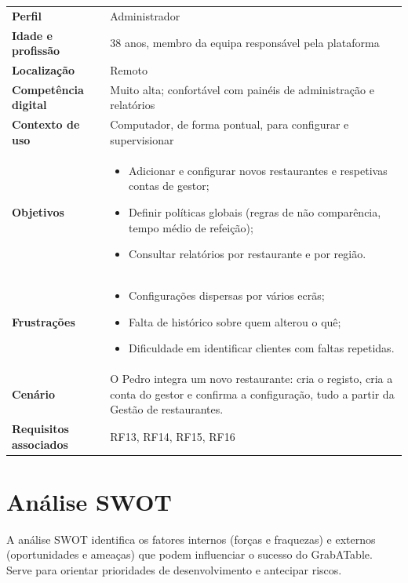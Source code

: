 \begin{tabularx}{\textwidth}{@{}>{\bfseries}p{3.4cm}X@{}}
\toprule
Perfil & Administrador \\
Idade e profissão & 38 anos, membro da equipa responsável pela plataforma \\
Localização & Remoto \\
Competência digital & Muito alta; confortável com painéis de administração e relatórios \\
Contexto de uso & Computador, de forma pontual, para configurar e supervisionar \\
\midrule
Objetivos &
\begin{itemize}[nosep,leftmargin=*]
  \item Adicionar e configurar novos restaurantes e respetivas contas de gestor;
  \item Definir políticas globais (regras de não comparência, tempo médio de refeição);
  \item Consultar relatórios por restaurante e por região.
\end{itemize} \\
Frustrações &
\begin{itemize}[nosep,leftmargin=*]
  \item Configurações dispersas por vários ecrãs;
  \item Falta de histórico sobre quem alterou o quê;
  \item Dificuldade em identificar clientes com faltas repetidas.
\end{itemize} \\
Cenário &
O Pedro integra um novo restaurante: cria o registo, cria a conta do gestor e confirma a configuração, tudo a partir da Gestão de restaurantes. \\
Requisitos associados & RF13, RF14, RF15, RF16 \\
\bottomrule
\end{tabularx}
 
 
 
\section{Análise SWOT}
 
A análise SWOT identifica os fatores internos (forças e fraquezas) e externos (oportunidades e ameaças) que podem influenciar o sucesso do GrabATable. Serve para orientar prioridades de desenvolvimento e antecipar riscos.
 

